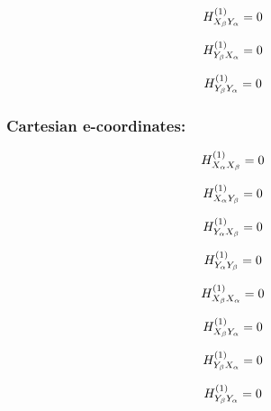 \documentclass[fleqn]{article}
\begin{document}
\begin{dmath*}
H_{X_{\beta}Y_{\alpha}}^{(1)}=0\\
\end{dmath*}

\begin{dmath*}
H_{Y_{\beta}X_{\alpha}}^{(1)}=0\\
\end{dmath*}

\begin{dmath*}
H_{Y_{\beta}Y_{\alpha}}^{(1)}=0\\
\end{dmath*}
\subsubsection*{Cartesian e-coordinates:}

\begin{dmath*}
H_{X_{\alpha}X_{\beta}}^{(1)}=0\\
\end{dmath*}

\begin{dmath*}
H_{X_{\alpha}Y_{\beta}}^{(1)}=0\\
\end{dmath*}

\begin{dmath*}
H_{Y_{\alpha}X_{\beta}}^{(1)}=0\\
\end{dmath*}

\begin{dmath*}
H_{Y_{\alpha}Y_{\beta}}^{(1)}=0\\
\end{dmath*}

\begin{dmath*}
H_{X_{\beta}X_{\alpha}}^{(1)}=0\\
\end{dmath*}

\begin{dmath*}
H_{X_{\beta}Y_{\alpha}}^{(1)}=0\\
\end{dmath*}

\begin{dmath*}
H_{Y_{\beta}X_{\alpha}}^{(1)}=0\\
\end{dmath*}

\begin{dmath*}
H_{Y_{\beta}Y_{\alpha}}^{(1)}=0\\
\end{dmath*}
\end{document}
